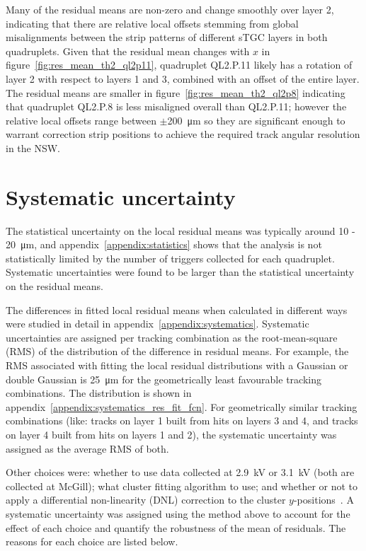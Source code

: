 Many of the residual means are non-zero and change smoothly over layer 2, indicating that there are relative local offsets stemming from global misalignments between the strip patterns of different sTGC layers in both quadruplets. Given that the residual mean changes with $x$ in figure~\ref{fig:res_mean_th2_ql2p11}, quadruplet QL2.P.11 likely has a rotation of layer 2 with respect to layers 1 and 3, combined with an offset of the entire layer. The residual means are smaller in figure~\ref{fig:res_mean_th2_ql2p8} indicating that quadruplet QL2.P.8 is less misaligned overall than QL2.P.11; however the relative local offsets range between $\pm$\SI{200}{\micro\meter} so they are significant enough to warrant correction strip positions to achieve the required track angular resolution in the NSW.

\section{Systematic uncertainty}
\label{sec:cosmics_sys_uncerts}

The statistical uncertainty on the local residual means was typically around \SI{10}{} - \SI{20}{\micro\meter}, and appendix~\ref{appendix:statistics} shows that the analysis is not statistically limited by the number of triggers collected for each quadruplet. Systematic uncertainties were found to be larger than the statistical uncertainty on the residual means.

The differences in fitted local residual means when calculated in different ways were studied in detail in appendix~\ref{appendix:systematics}. Systematic uncertainties are assigned per tracking combination as the root-mean-square (RMS) of the distribution of the difference in residual means. For example, the RMS associated with fitting the local residual distributions with a Gaussian or double Gaussian is \SI{25}{\micro\meter} for the geometrically least favourable tracking combinations. The distribution is shown in appendix~\ref{appendix:systematics_res_fit_fcn}. For geometrically similar tracking combinations (like: tracks on layer 1 built from hits on layers 3 and 4, and tracks on layer 4 built from hits on layers 1 and 2), the systematic uncertainty was assigned as the average RMS of both.

Other choices were: whether to use data collected at 2.9~kV or 3.1~kV (both are collected at McGill); what cluster fitting algorithm to use; and whether or not to apply a differential non-linearity (DNL) correction to the cluster $y$-positions~\cite{abusleme_performance_2016}. A systematic uncertainty was assigned using the method above to account for the effect of each choice and quantify the robustness of the mean of residuals. The reasons for each choice are listed below.

